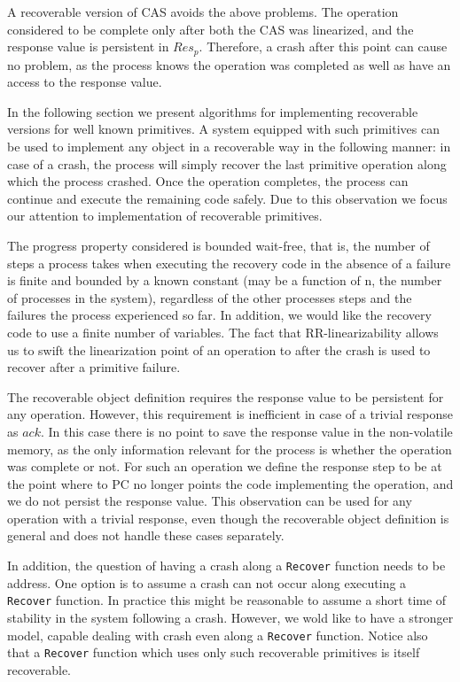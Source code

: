 A recoverable version of CAS avoids the above problems. The operation considered to be complete only after both the CAS was linearized, and the response value is persistent in $Res_p$. Therefore, a crash after this point can cause no problem, as the process knows the operation was completed as well as have an access to the response value.

In the following section we present algorithms for implementing recoverable versions for well known primitives. A system equipped with such primitives can be used to implement any object in a recoverable way in the following manner: in case of a crash, the process will simply recover the last primitive operation along which the process crashed. Once the operation completes, the process can continue and execute the remaining code safely. Due to this observation we focus our attention to implementation of recoverable primitives.

The progress property considered is bounded wait-free, that is, the number of steps a process takes when executing the recovery code in the absence of a failure is finite and bounded by a known constant (may be a function of n, the number of processes in the system), regardless of the other processes steps and the failures the process experienced so far. In addition, we would like the recovery code to use a finite number of variables.
The fact that RR-linearizability allows us to swift the linearization point of an operation to after the crash is used to recover after a primitive failure.

The recoverable object definition requires the response value to be persistent for any operation. However, this requirement is inefficient in case of a trivial response as $ack$. In this case there is no point to save the response value in the non-volatile memory, as the only information relevant for the process is whether the operation was complete or not. For such an operation we define the response step to be at the point where to PC no longer points the code implementing the operation, and we do not persist the response value. This observation can be used for any operation with a trivial response, even though the recoverable object definition is general and does not handle these cases separately.

In addition, the question of having a crash along a \texttt{Recover} function needs to be address. One option is to assume a crash can not occur along executing a \texttt{Recover} function. In practice this might be reasonable to assume a short time of stability in the system following a crash. However, we wold like to have a stronger model, capable dealing with crash even along a \texttt{Recover} function. Notice also that a \texttt{Recover} function which uses only such recoverable primitives is itself recoverable.

